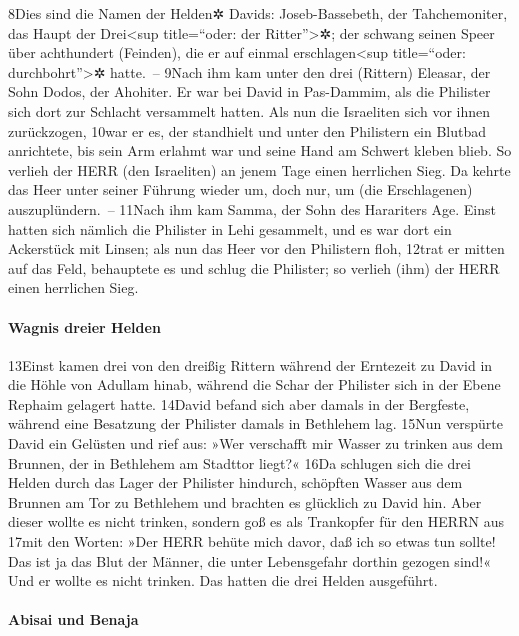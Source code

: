 8Dies sind die Namen der Helden✲ Davids: Joseb-Bassebeth, der
Tahchemoniter, das Haupt der Drei\textless sup title=``oder: der
Ritter''\textgreater✲; der schwang seinen Speer über achthundert
(Feinden), die er auf einmal erschlagen\textless sup title=``oder:
durchbohrt''\textgreater✲ hatte.~-- 9Nach ihm kam unter den drei
(Rittern) Eleasar, der Sohn Dodos, der Ahohiter. Er war bei David in
Pas-Dammim, als die Philister sich dort zur Schlacht versammelt hatten.
Als nun die Israeliten sich vor ihnen zurückzogen, 10war er es, der
standhielt und unter den Philistern ein Blutbad anrichtete, bis sein Arm
erlahmt war und seine Hand am Schwert kleben blieb. So verlieh der HERR
(den Israeliten) an jenem Tage einen herrlichen Sieg. Da kehrte das Heer
unter seiner Führung wieder um, doch nur, um (die Erschlagenen)
auszuplündern.~-- 11Nach ihm kam Samma, der Sohn des Harariters Age.
Einst hatten sich nämlich die Philister in Lehi gesammelt, und es war
dort ein Ackerstück mit Linsen; als nun das Heer vor den Philistern
floh, 12trat er mitten auf das Feld, behauptete es und schlug die
Philister; so verlieh (ihm) der HERR einen herrlichen Sieg.

\hypertarget{wagnis-dreier-helden}{%
\paragraph{Wagnis dreier Helden}\label{wagnis-dreier-helden}}

13Einst kamen drei von den dreißig Rittern während der Erntezeit zu
David in die Höhle von Adullam hinab, während die Schar der Philister
sich in der Ebene Rephaim gelagert hatte. 14David befand sich aber
damals in der Bergfeste, während eine Besatzung der Philister damals in
Bethlehem lag. 15Nun verspürte David ein Gelüsten und rief aus: »Wer
verschafft mir Wasser zu trinken aus dem Brunnen, der in Bethlehem am
Stadttor liegt?« 16Da schlugen sich die drei Helden durch das Lager der
Philister hindurch, schöpften Wasser aus dem Brunnen am Tor zu Bethlehem
und brachten es glücklich zu David hin. Aber dieser wollte es nicht
trinken, sondern goß es als Trankopfer für den HERRN aus 17mit den
Worten: »Der HERR behüte mich davor, daß ich so etwas tun sollte! Das
ist ja das Blut der Männer, die unter Lebensgefahr dorthin gezogen
sind!« Und er wollte es nicht trinken. Das hatten die drei Helden
ausgeführt.

\hypertarget{abisai-und-benaja}{%
\paragraph{Abisai und Benaja}\label{abisai-und-benaja}}

